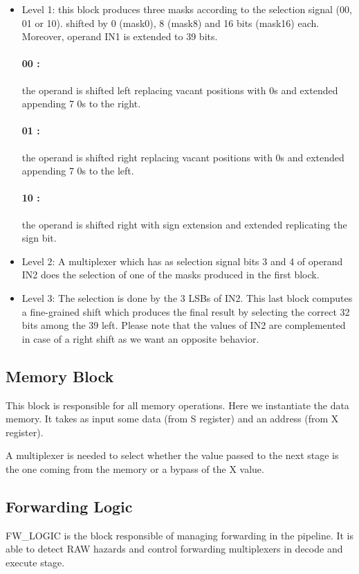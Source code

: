 \documentclass[12pt]{article}
\begin{document}
\begin{itemize}
	\item Level 1: this block produces three masks according to the selection signal (00, 01 or 10).
	shifted by 0 (mask0), 8 (mask8) and 16 bits (mask16) each. Moreover, operand IN1 is extended
	to 39 bits.
	\paragraph{00 :} the operand is shifted left replacing vacant positions with 0s and extended appending
	7 0s to the right.
	\paragraph{01 :} the operand is shifted right replacing vacant positions with 0s and extended appending
	7 0s to the left.	
	\paragraph{10 :} the operand is shifted right with sign extension and extended replicating the sign bit.
	
	\item Level 2: A multiplexer which has as selection signal bits 3 and 4 of operand IN2 does the selection of one of the masks produced in the first block.
	\item Level 3: The selection is done by the 3 LSBs of IN2. This last block computes a fine-grained shift which produces the final result by selecting the correct 32 bits among the 39 left.
	Please note that the values of IN2 are complemented in case of a right shift as we want an opposite behavior.
\end{itemize}


\subsection{Memory Block}
This block is responsible for all memory operations.
Here we instantiate the data memory. It takes as input some data (from S register) and an address (from X register).

A multiplexer is needed to select whether the value passed to the next stage is the one coming from the memory or a bypass of the X value.

\subsection{Forwarding Logic}
FW\_LOGIC is the block responsible of managing forwarding in the pipeline. It is able to detect RAW hazards and control forwarding multiplexers in decode and execute stage.
\end{document}
